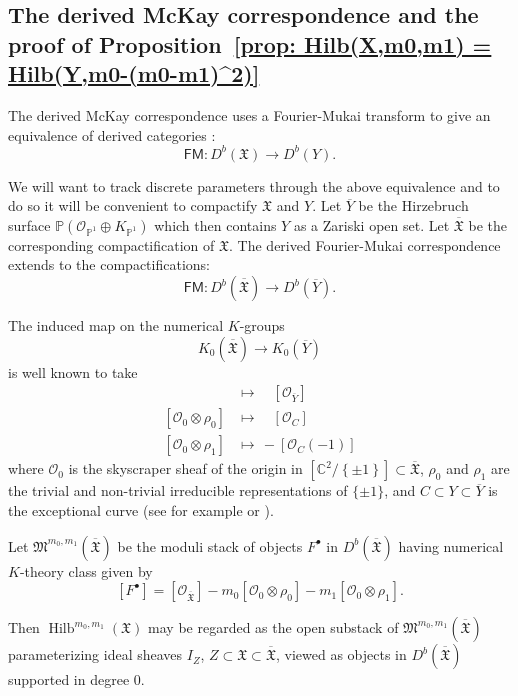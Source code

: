 \documentclass{amsart}
\theoremstyle{definition}
\newcommand{\CC} {{\mathbb C}}          %
\newcommand{\PP}{\mathbb{P}}
\newcommand{\X}{\mathfrak{X}}
\newcommand{\Xbar}{\overline{\mathfrak{X}}}
\newcommand{\Ybar}{\overline{Y}}
\newcommand{\M}{\mathfrak{M}}
\newcommand{\FM}{\mathsf{FM}}
\renewcommand{\O}{\mathcal{O}}
\newcommand{\Hilb}{\operatorname{Hilb}}
\begin{document}
\subsection{The derived McKay correspondence and the proof of
Proposition~\ref{prop: Hilb(X,m0,m1) =
Hilb(Y,m0-(m0-m1)^2)}}\label{sec: McKay correspondence}

The derived McKay correspondence uses a Fourier-Mukai transform to
give an equivalence of derived categories \cite{BKR, Kapranov-Vasserot}:
\[
\FM :D^{b}(\X )\to D^{b}(Y).
\]

We will want to track discrete parameters through the above
equivalence and to do so it will be convenient to compactify $\X$ and
$Y$. Let $\Ybar$ be the Hirzebruch surface $\PP (\O_{\PP^{1}}\oplus
K_{\PP^{1}})$ which then contains $Y$ as a Zariski open set. Let
$\Xbar$ be the corresponding compactification of $\X$. The derived
Fourier-Mukai correspondence extends to the compactifications:
\[
\FM : D^{b}(\Xbar )\to D^{b}(\Ybar ).
\]

The induced map on the numerical $K$-groups
\[
K_{0}(\Xbar ) \to K_{0}(\Ybar )
\]
is well known to take
\begin{align*}
[\O_{\Xbar}]& \longmapsto \quad [\O_{\Ybar }] \\
[\O_{0}\otimes \rho_{0}] &\longmapsto  \quad [\O_{C}]\\
[\O_{0}\otimes \rho_{1}] &\longmapsto \, -[\O_{C}(-1)]
\end{align*}
where $\O_{0}$ is the skyscraper sheaf of the origin in
$[\CC^{2}/\left\{\pm 1 \right\}]\subset \Xbar $,
$\rho_{0}$ and $\rho_{1}$ are the trivial and non-trivial irreducible
representations of $\{\pm 1 \}$, and $C\subset Y\subset \Ybar $ is the exceptional
curve (see for example \cite{Gonzalez-Sprinberg-Verdier} or \cite{Kapranov-Vasserot}).

Let $\M^{m_{0},m_{1}}(\Xbar )$ be the moduli stack of objects $F^{\bullet }$ in
$D^{b}(\Xbar )$ having numerical $K$-theory class given by
\[
[F^{\bullet}] = [\O_{\Xbar}] - m_{0}[\O_{0}\otimes \rho_{0}]  - m_{1}[\O_{0}\otimes \rho_{1}] .
\]

Then $\Hilb^{m_{0},m_{1}}(\X )$ may be regarded as the open substack
of $\M^{m_{0},m_{1}}(\Xbar )$ parameterizing ideal sheaves $I_{Z}$,
$Z\subset \X \subset \Xbar$, viewed as objects in $D^{b}(\Xbar )$
supported in degree 0.
\end{document}
